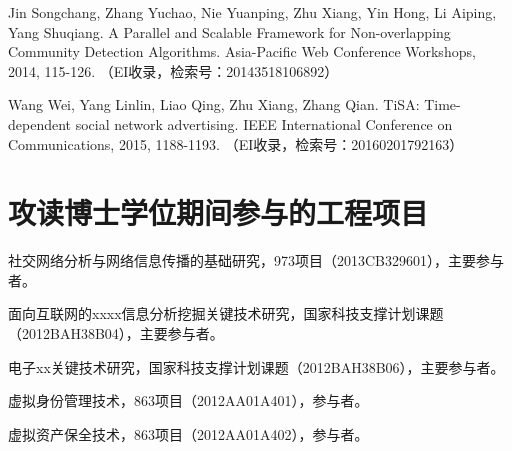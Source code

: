 \begin{resume}
\begin{enumerate}[{[}1{]}]
  \item Jin Songchang, Zhang Yuchao, Nie Yuanping, Zhu Xiang, Yin Hong, Li Aiping, Yang Shuqiang. A Parallel and Scalable Framework for Non-overlapping Community Detection Algorithms. Asia-Pacific Web Conference Workshops, 2014, 115-126. （EI收录，检索号：20143518106892）
  \item Wang Wei, Yang Linlin, Liao Qing, Zhu Xiang, Zhang Qian. TiSA: Time-dependent social network advertising. IEEE International Conference on Communications, 2015, 1188-1193. （EI收录，检索号：20160201792163）
  \end{enumerate}

  \section*{攻读博士学位期间参与的工程项目}
  \begin{enumerate}[{[}1{]}]
  \addtolength{\itemsep}{-.36\baselineskip}%
  \item 社交网络分析与网络信息传播的基础研究，973项目（2013CB329601），主要参与者。
  \item 面向互联网的xxxx信息分析挖掘关键技术研究，国家科技支撑计划课题（2012BAH38B04），主要参与者。
  \item 电子xx关键技术研究，国家科技支撑计划课题（2012BAH38B06），主要参与者。
  \item 虚拟身份管理技术，863项目（2012AA01A401），参与者。
  \item 虚拟资产保全技术，863项目（2012AA01A402），参与者。
  \end{enumerate}
\end{resume}
